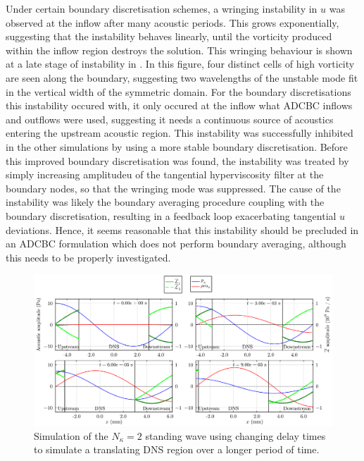 Under certain boundary discretisation schemes, a wringing instability in $u$ was observed at the inflow after many acoustic periods. This grows exponentially, suggesting that the instability behaves linearly, until the vorticity produced within the inflow region destroys the solution. This wringing behaviour is shown at a late stage of instability in . In this figure, four distinct cells of high vorticity are seen along the boundary, suggesting two wavelengths of the unstable mode fit in the vertical width of the symmetric domain. For the boundary discretisations this instability occured with, it only occured at the inflow what ADCBC inflows and outflows were used, suggesting it needs a continuous source of acoustics entering the upstream acoustic region. This instability was successfully inhibited in the other simulations by using a more stable boundary discretisation. Before this improved boundary discretisation was found, the instability was treated by simply increasing amplitudeu of the tangential hyperviscosity filter at the boundary nodes, so that the wringing mode was suppressed. The cause of the instability was likely the boundary averaging procedure coupling with the boundary discretisation, resulting in a feedback loop exacerbating tangential $u$ deviations. Hence, it seems reasonable that this instability should be precluded in an ADCBC formulation which does not perform boundary averaging, although this needs to be properly investigated.

\begin{figure}[t]
\centering
\includegraphics[scale=0.33]{assets/graphs/ac-plot-3-4_moving.pdf}
\caption{Simulation of the $N_κ = 2$ standing wave using changing delay times to simulate a translating DNS region over a longer period of time.}
\label{fig:moving-dns-region}
\end{figure}


